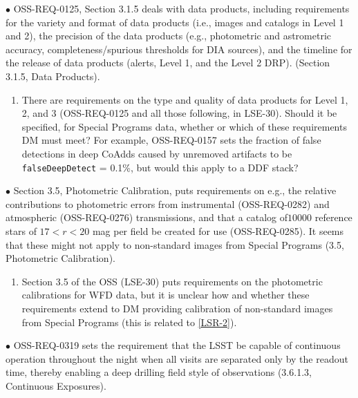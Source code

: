 \documentclass[DM,lsstdraft,toc]{lsstdoc}
\begin{document}
$\bullet$ OSS-REQ-0125, Section 3.1.5 deals with data products, including requirements for the variety and format of data products (i.e., images and catalogs in Level 1 and 2), the precision of the data products (e.g., photometric and astrometric accuracy, completeness/spurious thresholds for DIA sources), and the timeline for the release of data products (alerts, Level 1, and the Level 2 DRP).  (Section 3.1.5, Data Products).
\begin{enumerate}[topsep=-10pt,after=\vspace{10pt},label= \textbf{Concern \Roman*.},resume] \item \label{OSS-3} There are requirements on the type and quality of data products for Level 1, 2, and 3 (OSS-REQ-0125 and all those following, in LSE-30). Should it be specified, for Special Programs data, whether or which of these requirements DM must meet? For example, OSS-REQ-0157 sets the fraction of false detections in deep CoAdds caused by unremoved artifacts to be {\tt falseDeepDetect} = 0.1\%, but would this apply to a DDF stack? \end{enumerate}

$\bullet$ Section 3.5, Photometric Calibration, puts requirements on e.g., the relative contributions to photometric errors from instrumental (OSS-REQ-0282) and atmospheric (OSS-REQ-0276) transmissions, and that a catalog of$10000$ reference stars of $17<r<20$ mag per field be created for use (OSS-REQ-0285). It seems that these might not apply to non-standard images from Special Programs (3.5, Photometric Calibration).
\begin{enumerate}[topsep=-10pt,after=\vspace{10pt},label= \textbf{Concern \Roman*.},resume] \item \label{OSS-4} Section 3.5 of the OSS (LSE-30) puts requirements on the photometric calibrations for WFD data, but it is unclear how and whether these requirements extend to DM providing calibration of non-standard images from Special Programs (this is related to \ref{LSR-2}). \end{enumerate}

$\bullet$ OSS-REQ-0319 sets the requirement that the LSST be capable of continuous operation throughout the night when all visits are separated only by the readout time, thereby enabling a deep drilling field style of observations (3.6.1.3, Continuous Exposures).
\end{document}
